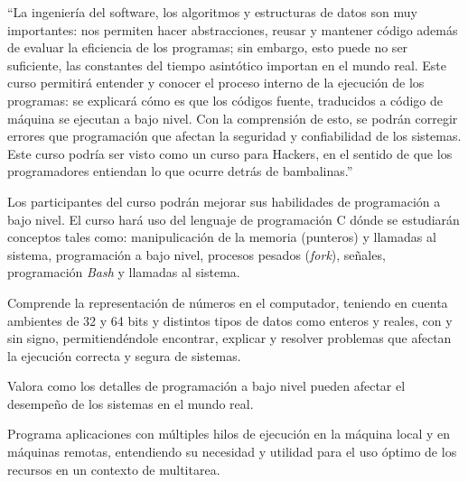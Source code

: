 \documentclass{article}
\begin{document}
\maketitle

\makeGeneralData

\makeAdministrativeData

\begin{motivation}
``La ingeniería del software, los algoritmos y estructuras de datos son muy importantes: nos permiten hacer abstracciones, reusar y mantener código además de evaluar la eficiencia de los programas; sin embargo, esto puede no ser suficiente, las constantes del tiempo asintótico importan en el mundo real. Este curso permitirá entender y conocer el proceso interno de la ejecución de los programas: se explicará cómo es que los códigos fuente, traducidos a código de máquina se ejecutan a bajo nivel. Con la comprensión de esto, se podrán corregir errores que programación que afectan la seguridad y confiabilidad de los sistemas. Este curso podría ser visto como un curso para Hackers, en el sentido de que los programadores entiendan lo que ocurre detrás de bambalinas.''

Los participantes del curso podrán mejorar sus habilidades de programación a bajo nivel. El curso hará uso del lenguaje de programación C dónde se estudiarán conceptos tales como: manipulicación de la memoria (punteros) y llamadas al sistema, programación a bajo nivel, procesos pesados (\emph{fork}), señales, programación \emph{Bash} y llamadas al sistema.
\end{motivation}

\begin{objective}
  \item Comprende la representación de números en el computador, teniendo en cuenta ambientes de 32 y 64 bits y distintos tipos de datos como enteros y reales, con y sin signo, permitiendéndole encontrar, explicar y resolver problemas que afectan la ejecución correcta y segura de sistemas.
  \item Valora como los detalles de programación a bajo nivel pueden afectar el desempeño de los sistemas en el mundo real.
  \item Programa aplicaciones con múltiples hilos de ejecución en la máquina local y en máquinas remotas, entendiendo su necesidad y utilidad para el uso óptimo de los recursos en un contexto de multitarea.
\end{objective}
\end{document}

